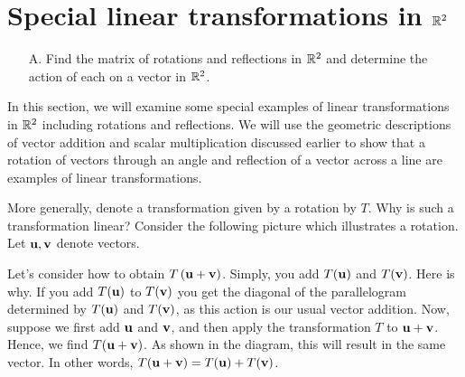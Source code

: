 \section{Special linear transformations in $\mathbb{R}^2$}

\begin{outcome}
\begin{enumerate}
\item[A.] Find the matrix of rotations and reflections in $\mathbb{R}^2$ and determine the action of each on a vector in $\mathbb{R}^2$. 
\end{enumerate}
\end{outcome}

In this section, we will examine some special examples of linear transformations in $\mathbb{R}^2$ including rotations and reflections. We will use the geometric descriptions of vector addition and scalar
multiplication discussed earlier to show that a rotation of vectors through an angle and reflection of a vector across a line are examples of
linear transformations. 

More generally, denote a transformation given by a rotation by $T$. Why is such a transformation
linear? Consider the following picture which illustrates a rotation. Let ${\bf u},{\bf v}$ denote vectors. 

\begin{center}
\end{center}

Let's consider how to obtain $T\left( {\bf u}+{\bf v}\right)$. 
Simply, you add $T ({\bf u})$ and $T({\bf v})$. 
Here is why. If you add $T({\bf u})$ to $T({\bf v})$ you get
the diagonal of the parallelogram determined by $T({\bf u})$ and $T({\bf v})$, as this action
is our usual vector addition.
Now, suppose we first add ${\bf u}$ and ${\bf v}$, and then apply the transformation $T$ to 
${\bf u}+{\bf v}$. Hence, we find $T( {\bf u}+{\bf v})$. 
As shown in the diagram, this will result in the same vector. In other words, $T({\bf u}+{\bf v}) = T({\bf u}) 
+ T({\bf v})$. 

